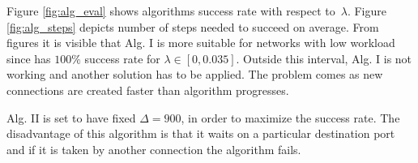 \documentclass{acm_proc_article-sp}
\begin{document}


Figure \ref{fig:alg_eval} shows algorithms success rate with respect to~$\lambda$. 
Figure \ref{fig:alg_steps} depicts number of steps needed 
to succeed on average. From figures it is visible that Alg. I is more suitable for networks with low 
workload since has $100\%$ success rate for $\lambda \in [0, 0.035]$. Outside this interval, 
Alg. I is not working and another solution has to be applied. The problem comes as new connections are
created faster than algorithm progresses.

Alg. II is set to have fixed $\Delta=900$, in order to maximize the success rate. The disadvantage of this
algorithm is that it waits on a particular destination port and if it is taken by another connection
the algorithm fails. 
\end{document}
